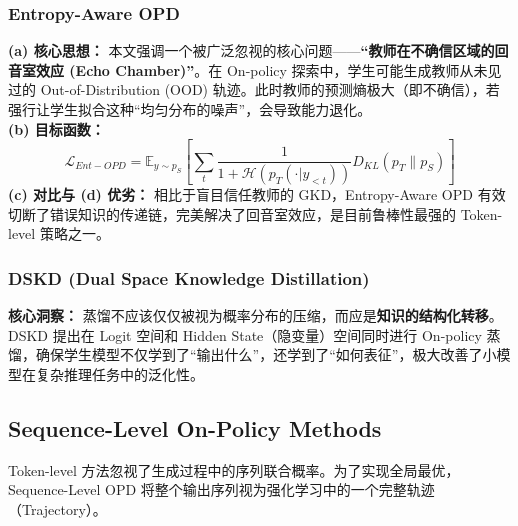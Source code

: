 \documentclass{article}
\begin{document}
\subsubsection{Entropy-Aware OPD \cite{2603.07079}}
\textbf{(a) 核心思想：} 本文强调一个被广泛忽视的核心问题——\textbf{“教师在不确信区域的回音室效应 (Echo Chamber)”}。在 On-policy 探索中，学生可能生成教师从未见过的 Out-of-Distribution (OOD) 轨迹。此时教师的预测熵极大（即不确信），若强行让学生拟合这种“均匀分布的噪声”，会导致能力退化。\\
\textbf{(b) 目标函数：}
\begin{equation}
    \mathcal{L}_{Ent-OPD} = \mathbb{E}_{y \sim p_S} \left[ \sum_t \frac{1}{1 + \mathcal{H}(p_T(\cdot|y_{<t}))} D_{KL}(p_T \parallel p_S) \right]
\end{equation}
\textbf{(c) 对比与 (d) 优劣：} 相比于盲目信任教师的 GKD，Entropy-Aware OPD 有效切断了错误知识的传递链，完美解决了回音室效应，是目前鲁棒性最强的 Token-level 策略之一。

\subsubsection{DSKD (Dual Space Knowledge Distillation) \cite{2502.12018}}
\textbf{核心洞察：} 蒸馏不应该仅仅被视为概率分布的压缩，而应是\textbf{知识的结构化转移}。DSKD 提出在 Logit 空间和 Hidden State（隐变量）空间同时进行 On-policy 蒸馏，确保学生模型不仅学到了“输出什么”，还学到了“如何表征”，极大改善了小模型在复杂推理任务中的泛化性。

\subsection{Sequence-Level On-Policy Methods}
\label{subsec:sequence_level}

Token-level 方法忽视了生成过程中的序列联合概率。为了实现全局最优，Sequence-Level OPD 将整个输出序列视为强化学习中的一个完整轨迹（Trajectory）。
\end{document}
